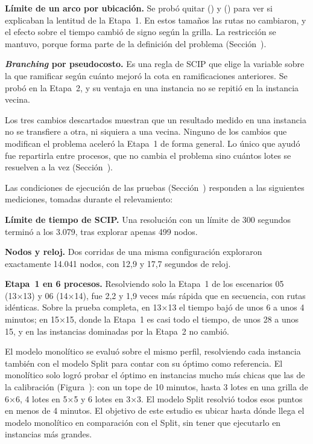 {\bf Límite de un arco por ubicación.} Se probó quitar
() y () para ver si explicaban la
lentitud de la Etapa~1. En estos tamaños las rutas no cambiaron, y el efecto
sobre el tiempo cambió de signo según la grilla. La restricción se mantuvo,
porque forma parte de la definición del problema
(Sección~).

{\bf {\em Branching} por pseudocosto.} Es una regla de SCIP que elige la
variable sobre la que ramificar según cuánto mejoró la cota en ramificaciones
anteriores. Se probó en la Etapa~2, y su ventaja en una instancia no se
repitió en la instancia vecina.

Los tres cambios descartados muestran que un resultado medido en una instancia no se
transfiere a otra, ni siquiera a una vecina. Ninguno de los cambios que
modifican el problema aceleró la Etapa~1 de forma general. Lo único que
ayudó fue repartirla entre procesos, que no cambia el problema sino cuántos
lotes se resuelven a la vez (Sección~).

\stopsection

\startsection[title={Medición de los tiempos}, reference=sec:anexo_medicion]

Las condiciones de ejecución de las pruebas (Sección~)
responden a las siguientes mediciones, tomadas durante el relevamiento:
\startitemize
	\item {\bf Límite de tiempo de SCIP.} Una resolución con un límite de 300
	segundos terminó a los 3.079, tras explorar apenas 499 nodos.
	\item {\bf Nodos y reloj.} Dos corridas de una misma configuración
	exploraron exactamente 14.041 nodos, con 12,9 y 17,7 segundos de reloj.
	\item {\bf Etapa~1 en 6 procesos.} Resolviendo solo la Etapa~1 de los
	escenarios 05 (13×13) y 06 (14×14), fue 2,2 y 1,9 veces más rápida que
	en secuencia, con rutas idénticas. Sobre la prueba completa, en 13×13 el
	tiempo bajó de unos 6 a unos 4 minutos; en 15×15, donde la Etapa~1 es
	casi todo el tiempo, de unos 28 a unos 15, y en las instancias dominadas
	por la Etapa~2 no cambió.
\stopitemize

\stopsection

\startsection[title={Alcance del modelo monolítico}, reference=sec:alcance_monolitico]

El modelo monolítico se evaluó sobre el mismo perfil, resolviendo cada
instancia también con el modelo Split para contar con su óptimo como
referencia. El monolítico solo logró probar el óptimo en instancias mucho
más chicas que las de la calibración (Figura~): con
un tope de 10 minutos, hasta 3 lotes en una grilla de 6×6, 4 lotes en 5×5
y 6 lotes en 3×3. El modelo Split resolvió todos esos puntos en menos de
4 minutos. El objetivo de este estudio es ubicar hasta
dónde llega el modelo monolítico en comparación con el Split, sin tener que
ejecutarlo en instancias más grandes.

